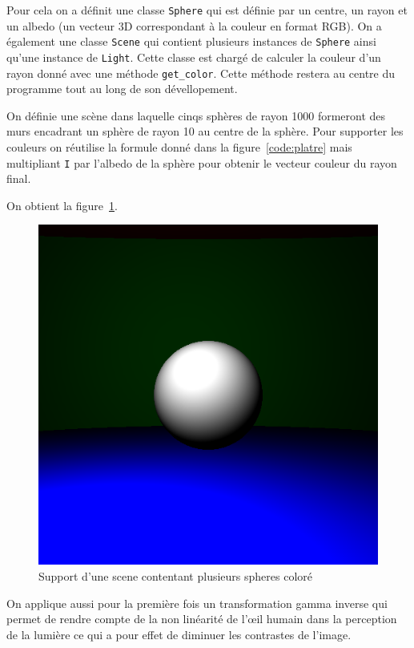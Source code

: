 \documentclass[12pt]{article}
\newcommand\id[1]{\texttt{#1}}
\begin{document}
Pour cela on a définit une classe \id{Sphere} qui est définie par un centre, un rayon et un albedo (un vecteur 3D correspondant à la couleur en format RGB).
On a également une classe \id{Scene} qui contient plusieurs instances de \id{Sphere} ainsi qu'une instance de \id{Light}.
Cette classe est chargé de calculer la couleur d'un rayon donné avec une méthode \id{get\_color}.
Cette méthode restera au centre du programme tout au long de son dévellopement.

On définie une scène dans laquelle cinqs sphères de rayon 1000 formeront des murs encadrant un sphère de rayon 10 au centre de la sphère.
Pour supporter les couleurs on réutilise la formule donné dans la figure~\ref{code:platre} mais multipliant \id{I} par l'albedo de la sphère pour obtenir le vecteur couleur du rayon final.

On obtient la figure~\ref{fig:step3}.

\begin{figure}[ht]
  \centering
  \includegraphics[width=12cm]{../result/step3}
  \caption{Support d'une scene contentant plusieurs spheres coloré}\label{fig:step3}
\end{figure}

On applique aussi pour la première fois un transformation gamma inverse qui permet de rendre compte de la non linéarité de l'œil humain dans la perception de la lumière ce qui a pour effet de diminuer les contrastes de l'image.
\end{document}
